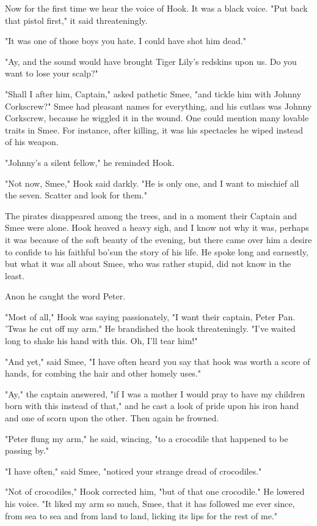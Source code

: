Now for the first time we hear the voice of Hook.
It was a black voice.
"Put back that pistol first," it said threateningly.

"It was one of those boys you hate.
I could have shot him dead."

"Ay, and the sound would have brought Tiger Lily's redskins upon us.
Do you want to lose your scalp?"

"Shall I after him, Captain," asked pathetic Smee, "and tickle him with Johnny Corkscrew?"
Smee had pleasant names for everything, and his cutlass was Johnny Corkscrew, because he wiggled it in the wound.
One could mention many lovable traits in Smee.
For instance, after killing, it was his spectacles he wiped instead of his weapon.

"Johnny's a silent fellow," he reminded Hook.

"Not now, Smee," Hook said darkly.
"He is only one, and I want to mischief all the seven.
Scatter and look for them."

The pirates disappeared among the trees, and in a moment their Captain and Smee were alone.
Hook heaved a heavy sigh, and I know not why it was, perhaps it was because of the soft beauty of the evening, but there came over him a desire to confide to his faithful bo'sun the story of his life.
He spoke long and earnestly, but what it was all about Smee, who was rather stupid, did not know in the least.

Anon he caught the word Peter.

"Most of all," Hook was saying passionately, "I want their captain, Peter Pan.
'Twas he cut off my arm."
He brandished the hook threateningly.
"I've waited long to shake his hand with this.
Oh, I'll tear him!"

"And yet," said Smee, "I have often heard you say that hook was worth a score of hands, for combing the hair and other homely uses."

"Ay," the captain answered, "if I was a mother I would pray to have my children born with this instead of that," and he cast a look of pride upon his iron hand and one of scorn upon the other.
Then again he frowned.

"Peter flung my arm," he said, wincing, "to a crocodile that happened to be passing by."

"I have often," said Smee, "noticed your strange dread of crocodiles."

"Not of crocodiles," Hook corrected him, "but of that one crocodile."
He lowered his voice.
"It liked my arm so much, Smee, that it has followed me ever since, from sea to sea and from land to land, licking its lips for the rest of me."

